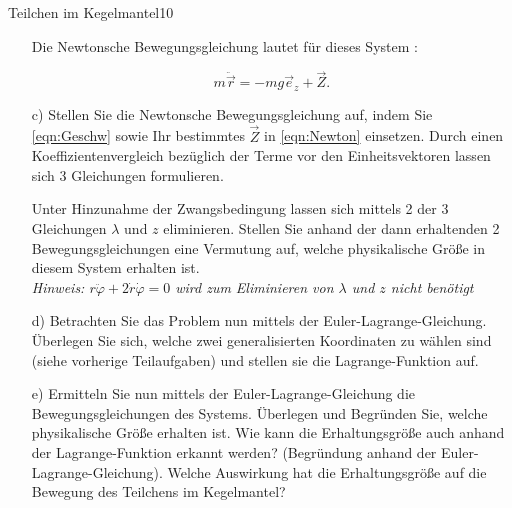 \begin{exercise}{Teilchen im Kegelmantel}{10}
\begin{enumerate}
    Die Newtonsche Bewegungsgleichung lautet für dieses System :

    \begin{equation}
      m \ddot{\vec{r}} = - mg\vec{e}_{z} + \vec{Z}.
      \label{eqn:Newton}
    \end{equation}

    \item[c)] Stellen Sie die Newtonsche Bewegungsgleichung auf, indem Sie
    \eqref{eqn:Geschw} sowie Ihr bestimmtes $\vec{Z}$ in \eqref{eqn:Newton}
    einsetzen. Durch einen Koeffizientenvergleich bezüglich der Terme vor den
    Einheitsvektoren lassen sich 3 Gleichungen formulieren.

    Unter Hinzunahme der
    Zwangsbedingung lassen sich mittels 2 der 3 Gleichungen $\lambda$ und $z$
    eliminieren. Stellen Sie anhand der dann erhaltenden 2 Bewegungsgleichungen
    eine Vermutung auf, welche physikalische Grö\ss{}e in diesem System erhalten ist.
    \\
    \textit{Hinweis: $r\ddot{\varphi} + 2\dot{r}\dot{\varphi} = 0$ wird zum Eliminieren
    von $\lambda$ und $z$ nicht benötigt}

    \item[d)] Betrachten Sie das Problem nun mittels der Euler-Lagrange-Gleichung.
    Überlegen Sie sich, welche zwei generalisierten Koordinaten zu wählen sind
    (siehe vorherige Teilaufgaben) und stellen sie die Lagrange-Funktion auf.

    \item[e)] Ermitteln Sie nun mittels der Euler-Lagrange-Gleichung die Bewegungsgleichungen
    des Systems. Überlegen und Begründen Sie, welche physikalische Grö\ss{}e erhalten
    ist. Wie kann die Erhaltungsgrö\ss{}e auch anhand der Lagrange-Funktion erkannt
    werden? (Begründung anhand der Euler-Lagrange-Gleichung). Welche Auswirkung
    hat die Erhaltungsgrö\ss{}e auf die Bewegung des Teilchens im Kegelmantel?

  \end{enumerate}
\end{exercise}
